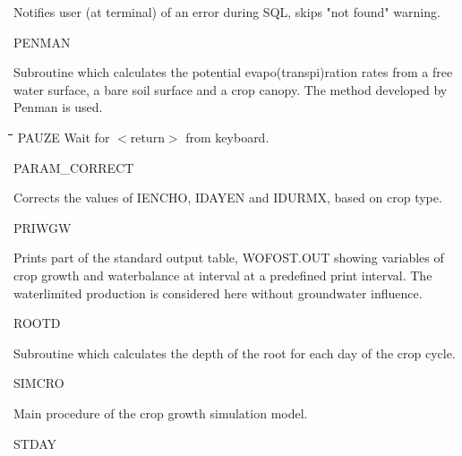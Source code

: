 \documentclass[11pt]{article}
\begin{document}
\begin{indenting}{5.08cm}
Notifies user (at terminal) of an error during SQL, skips "not
found" warning.
\end{indenting}
PENMAN
\testlastline

\begin{indenting}{5.08cm}
Subroutine which calculates the potential evapo(trans\-pi)ration
rates from a free water surface, a bare soil surface and a
crop canopy. The method developed by Penman is used.
\end{indenting}
\begin{tabbing}
\hspace{1.27cm}\=\hspace{1.27cm}\=\hspace{1.27cm}\=\hspace{1.27cm}\=%
\hspace{1.27cm}\=\hspace{1.27cm}\=\hspace{1.27cm}\=\hspace{1.27cm}\=%
\hspace{1.27cm}\=\hspace{1.27cm}\=\kill
PAUZE\> \> \> \> Wait for $<$return$>$ from keyboard.
\end{tabbing}
PARAM\_CORRECT
\testlastline

\begin{indenting}{5.08cm}
Corrects the values of IENCHO, IDAYEN and IDUR\-MX,
based on crop type.
\end{indenting}
PRIWGW
\testlastline

\begin{indenting}{5.08cm}
Prints part of the standard output table, WOFOST.OUT
showing variables of crop growth and waterbalance at inter\-val at a predefined print interval. The waterlimited produc\-tion is considered here without groundwater influence.
\end{indenting}

 \bigskip
 ROOTD
\testlastline

\begin{indenting}{5.08cm}
Subroutine which calculates the depth of the root for each
day of the crop cycle.
\end{indenting}
SIMCRO
\testlastline

\begin{indenting}{5.08cm}
Main procedure of the crop growth\-{\nobreak} simulati\-on model.
\end{indenting}
STDAY
\testlastline
\end{document}
